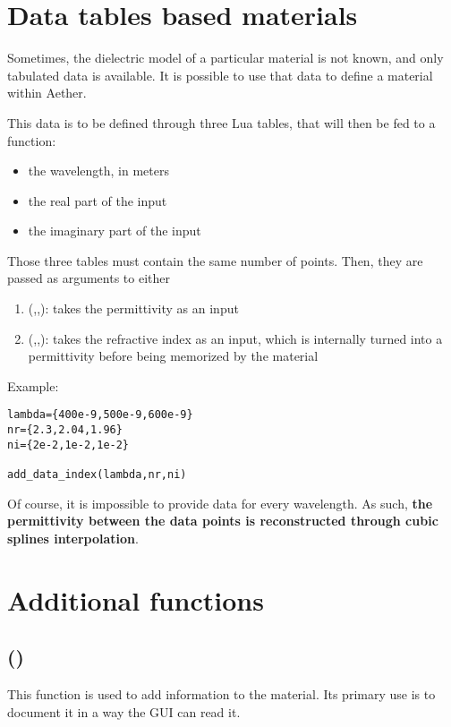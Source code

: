 \section{Data tables based materials}

Sometimes, the dielectric model of a particular material is not known, and only tabulated data is available. It is possible to use that data to define a material within Aether.

This data is to be defined through three Lua tables, that will then be fed to a function:
\begin{itemize}
	\item the wavelength, in meters
	\item the real part of the input
	\item the imaginary part of the input
\end{itemize}
Those three tables must contain the same number of points. Then, they are passed as arguments to either
\begin{enumerate}
	\item {}(,,): takes the permittivity as an input
	\item {}(,,): takes the refractive index as an input, which is internally turned into a permittivity  before being memorized by the material
\end{enumerate}
Example:
\begin{lstlisting}
lambda={400e-9,500e-9,600e-9}
nr={2.3,2.04,1.96}
ni={2e-2,1e-2,1e-2}

add_data_index(lambda,nr,ni)
\end{lstlisting}

Of course, it is impossible to provide data for every wavelength. As such, \textbf{the permittivity between the data points is reconstructed through cubic splines interpolation}.

\section{Additional functions}

\subsection[description]{()}

This function is used to add information to the material. Its primary use is to document it in a way the GUI can read it.

